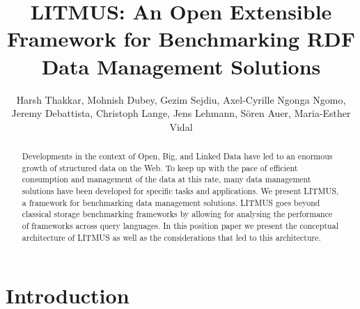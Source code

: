\documentclass{llncs}
\begin{document}
\title{LITMUS: An Open Extensible Framework for Benchmarking RDF Data Management Solutions}


\author{Harsh Thakkar, Mohnish Dubey, Gezim Sejdiu, Axel-Cyrille Ngonga Ngomo, Jeremy Debattista, Christoph Lange, Jens Lehmann, S\"{o}ren Auer, Maria-Esther Vidal}
\maketitle

\begin{abstract}
Developments in the context of Open, Big, and Linked Data have led to an enormous growth of structured data
on the Web. 
To keep up with the pace of efficient consumption and management of the data at this rate, many data management solutions have been developed for specific tasks and applications.
We present LITMUS, a framework for benchmarking data management solutions.
LITMUS goes beyond classical storage benchmarking frameworks by allowing for analysing the performance of frameworks across query languages.
In this position paper we present the conceptual architecture of LITMUS as well as the considerations that led to this architecture.
\end{abstract}

\section{Introduction}\label{sec:Introduction}
     
\end{document}
